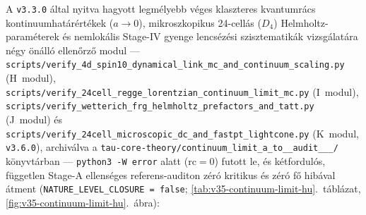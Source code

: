 \documentclass[11pt,a4paper]{article}
\begin{document}
A \texttt{v3.3.0} által nyitva hagyott legmélyebb véges klaszteres kvantumrács kontinuumhatárértékek ($a \to 0$), mikroszkopikus 24-cellás ($D_4$) Helmholtz-paraméterek és nemlokális Stage-IV gyenge lencsézési szisztematikák vizsgálatára négy önálló ellenőrző modul --- \texttt{scripts/\allowbreak verify\_\allowbreak 4d\_\allowbreak spin10\_\allowbreak dynamical\_\allowbreak link\_\allowbreak mc\_\allowbreak and\_\allowbreak continuum\_\allowbreak scaling.py} (H~modul), \texttt{scripts/\allowbreak verify\_\allowbreak 24cell\_\allowbreak regge\_\allowbreak lorentzian\_\allowbreak continuum\_\allowbreak limit\_\allowbreak mc.py} (I~modul), \texttt{scripts/\allowbreak verify\_\allowbreak wetterich\_\allowbreak frg\_\allowbreak helmholtz\_\allowbreak prefactors\_\allowbreak and\_\allowbreak tatt.py} (J~modul) és \texttt{scripts/\allowbreak verify\_\allowbreak 24cell\_\allowbreak microscopic\_\allowbreak dc\_\allowbreak and\_\allowbreak fastpt\_\allowbreak lightcone.py} (K~modul, \texttt{v3.6.0}), archiválva a \texttt{tau-core-theory/\allowbreak continuum\_\allowbreak limit\_\allowbreak a\_\allowbreak to\_\_\allowbreak audit\_\_\_/} könyvtárban --- \texttt{python3 -W error} alatt ($\mathrm{rc}=0$) futott le, és kétfordulós, független Stage-A ellenséges referens-auditon zéró kritikus és zéró fő hibával átment (\texttt{NATURE\_\allowbreak LEVEL\_\allowbreak CLOSURE = false}; \ref{tab:v35-continuum-limit-hu}.~táblázat, \ref{fig:v35-continuum-limit-hu}.~ábra):
\end{document}
